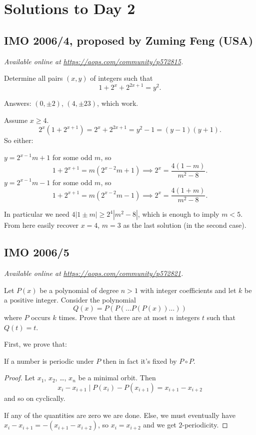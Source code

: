 \documentclass[11pt]{scrartcl}
\begin{document}
\section{Solutions to Day 2}
\subsection{IMO 2006/4, proposed by Zuming Feng (USA)}
\textsl{Available online at \url{https://aops.com/community/p572815}.}
\begin{mdframed}[style=mdpurplebox,frametitle={Problem statement}]
Determine all pairs $(x,y)$ of integers such that
\[ 1 + 2^x + 2^{2x+1} = y^2. \]
\end{mdframed}
Answers: $(0, \pm 2)$, $(4, \pm 23)$, which work.

Assume $x \ge 4$.
\[ 2^x \left( 1 + 2^{x+1} \right)
  = 2^x + 2^{2x+1} = y^2 - 1 = (y-1)(y+1). \]
So either:
\begin{itemize}
  \ii $y = 2^{x-1} m + 1$ for some odd $m$, so
  \[ 1 + 2^{x+1} = m\left( 2^{x-2}m+1 \right)
    \implies 2^x = \frac{4(1-m)}{m^2-8}. \]
  \ii $y = 2^{x-1} m - 1$ for some odd $m$, so
  \[ 1 + 2^{x+1} = m\left( 2^{x-2}m-1 \right)
    \implies 2^x = \frac{4(1+m)}{m^2-8}. \]
\end{itemize}
In particular we need $4|1 \pm m| \ge 2^4 |m^2-8|$,
which is enough to imply $m < 5$.
From here easily recover $x = 4$, $m = 3$ as the last solution
(in the second case).
\pagebreak

\subsection{IMO 2006/5}
\textsl{Available online at \url{https://aops.com/community/p572821}.}
\begin{mdframed}[style=mdpurplebox,frametitle={Problem statement}]
Let $P(x)$ be a polynomial of degree $n > 1$
with integer coefficients and let $k$ be a positive integer.
Consider the polynomial
\[ Q(x) = P(P(\dots P(P(x)) \dots )) \] where $P$ occurs $k$ times.
Prove that there are at most $n$ integers $t$ such that $Q(t) = t$.
\end{mdframed}
First, we prove that:
\begin{claim*}
  [Putnam 2000 et al]
  If a number is periodic under $P$
  then in fact it's fixed by $P \circ P$.
\end{claim*}
\begin{proof}
  Let $x_1$, $x_2$, \dots, $x_n$ be a minimal orbit.
  Then
  \[ x_i - x_{i+1} \mid P(x_i) - P(x_{i+1})
    = x_{i+1} - x_{i+2} \]
  and so on cyclically.

  If any of the quantities are zero we are done.
  Else, we must eventually have $x_i - x_{i+1} = -(x_{i+1} - x_{i+2})$,
  so $x_i = x_{i+2}$ and we get $2$-periodicity.
\end{proof}
\end{document}
